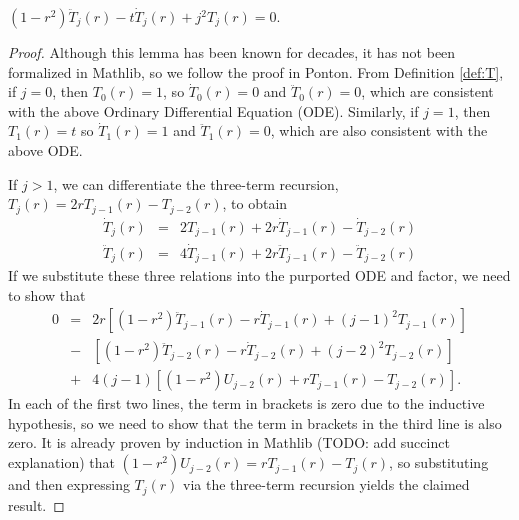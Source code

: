 \begin{lemma}
  \label{lem:ODE}
  $\left(1 - r^2\right) \ddot{T}_{j}\left(r\right) - t \dot{T}_{j}\left(r\right) + j^2 T_j\left(r\right) = 0$.
\end{lemma}
\begin{proof}
  Although this lemma has been known for decades, it has not been formalized in Mathlib, so we follow the proof in Ponton. From Definition \ref{def:T}, if $j = 0$, then $T_0\left(r\right) = 1$, so $\dot{T}_0\left(r\right) = 0$ and $\ddot{T}_0\left(r\right) = 0$, which are consistent with the above Ordinary Differential Equation (ODE). Similarly, if $j = 1$, then $T_1\left(r\right) = t$ so $\dot{T}_1\left(r\right) = 1$ and $\ddot{T}_1\left(r\right) = 0$, which are also consistent with the above ODE.
  
  If $j > 1$, we can differentiate the three-term recursion, $T_j\left(r\right) = 2 r T_{j - 1}\left(r\right) - T_{j - 2}\left(r\right)$, to obtain
  \begin{eqnarray*}
    \dot{T}_j\left(r\right)  &=& 2 T_{j - 1}\left(r\right) + 2 r \dot{T}_{j - 1}\left(r\right) - \dot{T}_{j - 2}\left(r\right) \\
    \ddot{T}_j\left(r\right) &=& 4 \dot{T}_{j - 1}\left(r\right) + 2 r \ddot{T}_{j - 1}\left(r\right) - \ddot{T}_{j - 2}\left(r\right)
  \end{eqnarray*}
  If we substitute these three relations into the purported ODE and factor, we need to show that
  \begin{eqnarray*}
  0 &=& 2r \left[ \left(1 - r^2\right) \ddot{T}_{j - 1}\left(r\right) - r \dot{T}_{j - 1}\left(r\right) + \left(j - 1\right)^2 T_{j - 1}\left(r\right) \right] \\
    &-& \left[\left(1 - r^2\right) \ddot{T}_{j - 2}\left(r\right) - r \dot{T}_{j - 2}\left(r\right) + \left(j - 2\right)^2 T_{j - 2}\left(r\right)  \right] \\
    &+& 4 \left(j - 1\right) \left[\left(1 - r^2\right) U_{j - 2}\left(r\right) +  r T_{j - 1}\left(r\right) - T_{j - 2}\left(r\right)  \right].
  \end{eqnarray*}
  In each of the first two lines, the term in brackets is zero due to the inductive hypothesis, so we need to show that the term in brackets in the third line is also zero. It is already proven by induction in Mathlib (TODO: add succinct explanation) that $\left(1 - r^2\right) U_{j - 2}\left(r\right) = r T_{j - 1}\left(r\right) - T_{j}\left(r\right)$, so substituting and then expressing $T_{j}\left(r\right)$ via the three-term recursion yields the claimed result.
\end{proof}


